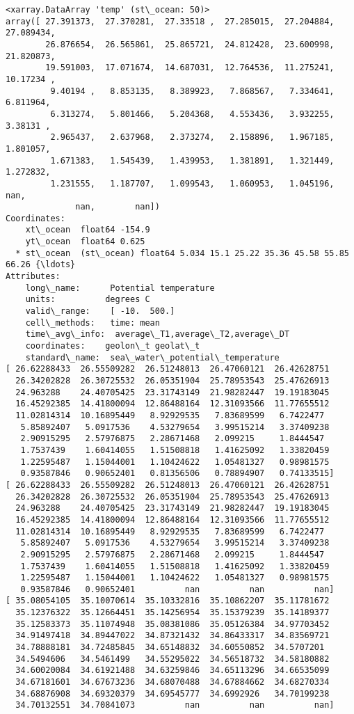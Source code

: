 \documentclass[11pt]{article}
\begin{document}
    \begin{Verbatim}[commandchars=\\\{\}]
<xarray.DataArray 'temp' (st\_ocean: 50)>
array([ 27.391373,  27.370281,  27.33518 ,  27.285015,  27.204884,  27.089434,
        26.876654,  26.565861,  25.865721,  24.812428,  23.600998,  21.820873,
        19.591003,  17.071674,  14.687031,  12.764536,  11.275241,  10.17234 ,
         9.40194 ,   8.853135,   8.389923,   7.868567,   7.334641,   6.811964,
         6.313274,   5.801466,   5.204368,   4.553436,   3.932255,   3.38131 ,
         2.965437,   2.637968,   2.373274,   2.158896,   1.967185,   1.801057,
         1.671383,   1.545439,   1.439953,   1.381891,   1.321449,   1.272832,
         1.231555,   1.187707,   1.099543,   1.060953,   1.045196,        nan,
              nan,        nan])
Coordinates:
    xt\_ocean  float64 -154.9
    yt\_ocean  float64 0.625
  * st\_ocean  (st\_ocean) float64 5.034 15.1 25.22 35.36 45.58 55.85 66.26 {\ldots}
Attributes:
    long\_name:      Potential temperature
    units:          degrees C
    valid\_range:    [ -10.  500.]
    cell\_methods:   time: mean
    time\_avg\_info:  average\_T1,average\_T2,average\_DT
    coordinates:    geolon\_t geolat\_t
    standard\_name:  sea\_water\_potential\_temperature
[ 26.62288433  26.55509282  26.51248013  26.47060121  26.42628751
  26.34202828  26.30725532  26.05351904  25.78953543  25.47626913
  24.963288    24.40705425  23.31743149  21.98282447  19.19183045
  16.45292385  14.41800094  12.86488164  12.31093566  11.77655512
  11.02814314  10.16895449   8.92929535   7.83689599   6.7422477
   5.85892407   5.0917536    4.53279654   3.99515214   3.37409238
   2.90915295   2.57976875   2.28671468   2.099215     1.8444547
   1.7537439    1.60414055   1.51508818   1.41625092   1.33820459
   1.22595487   1.15044001   1.10424622   1.05481327   0.98981575
   0.93587846   0.90652401   0.81356506   0.78894907   0.74133515]
[ 26.62288433  26.55509282  26.51248013  26.47060121  26.42628751
  26.34202828  26.30725532  26.05351904  25.78953543  25.47626913
  24.963288    24.40705425  23.31743149  21.98282447  19.19183045
  16.45292385  14.41800094  12.86488164  12.31093566  11.77655512
  11.02814314  10.16895449   8.92929535   7.83689599   6.7422477
   5.85892407   5.0917536    4.53279654   3.99515214   3.37409238
   2.90915295   2.57976875   2.28671468   2.099215     1.8444547
   1.7537439    1.60414055   1.51508818   1.41625092   1.33820459
   1.22595487   1.15044001   1.10424622   1.05481327   0.98981575
   0.93587846   0.90652401          nan          nan          nan]
[ 35.08054105  35.10070614  35.10332816  35.10862207  35.11781672
  35.12376322  35.12664451  35.14256954  35.15379239  35.14189377
  35.12583373  35.11074948  35.08381086  35.05126384  34.97703452
  34.91497418  34.89447022  34.87321432  34.86433317  34.83569721
  34.78888181  34.72485845  34.65148832  34.60550852  34.5707201
  34.5494606   34.5461499   34.55295022  34.56518732  34.58180882
  34.60020084  34.61921488  34.63259846  34.65113296  34.66535099
  34.67181601  34.67673236  34.68070488  34.67884662  34.68270334
  34.68876908  34.69320379  34.69545777  34.6992926   34.70199238
  34.70132551  34.70841073          nan          nan          nan]


\end{Verbatim}
\end{document}
